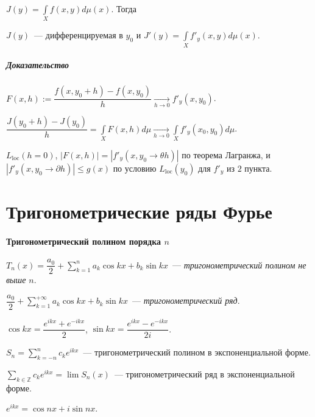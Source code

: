 \documentclass{article}
\begin{document}
        $J(y) = \int\limits_X f(x, y) d \mu(x)$. Тогда
        
        $J(y)$~--- дифференцируемая в $y_0$ и $J'(y) = \int\limits_X f'_y(x, y) d \mu (x)$.
        
        \subsubsection{Доказательство}
        
            $F(x, h) := \dfrac{f(x, y_0 + h) - f(x, y_0)}{h} \xrightarrow[h \rightarrow 0]{} f'_y (x, y_0)$.
            
            $\dfrac{J(y_0 + h) - J(y_0)}{h} = \int\limits_X F(x, h) d \mu \xrightarrow[h \rightarrow 0]{} \int\limits_X f'_y(x_0, y_0) d \mu$.
            
            $L_{\mathrm{loc}} (h = 0)$, $\left| F(x, h) \right| = \left| f'_y (x, y_0 \rightarrow \theta h ) \right|$ по теорема Лагранжа, и $\left| f'_y (x, y_0 \rightarrow \partial h ) \right| \leqslant g(x)$ по условию $L_{\mathrm{loc}}(y_0)$ для $f'_y$ из $2$ пункта.
            
\newpage

\part{Тригонометрические ряды Фурье}

    \subsection{Тригонометрический полином порядка $n$}
    
        $T_n(x) = \dfrac{a_0}{2} + \sum\limits_{k = 1}^n a_k \cos {kx} + b_k \sin {kx}$~--- \textit{тригонометрический полином не выше $n$}.
        
        $\dfrac{a_0}{2} + \sum\limits_{k = 1}^{+\infty} a_k \cos {kx} + b_k \sin {kx}$~--- \textit{тригонометрический ряд}.
        
        $\cos{kx} = \dfrac{e^{ikx} + e^{-ikx}}{2}$, $\sin{kx} = \dfrac{e^{ikx} - e^{-ikx}}{2i}$.
        
        $S_n = \sum\limits_{k = -n}^n c_k e^{ikx}$~--- тригонометрический полином в экспоненциальной форме.
        
        $\sum\limits_{k \in \mathbb{Z}} c_k e^{ikx} = \lim S_n(x)$~--- тригонометрический ряд в экспоненциальной форме.
        
        $e^{ikx} = \cos {nx} + i \sin {nx}$.
        
\end{document}
